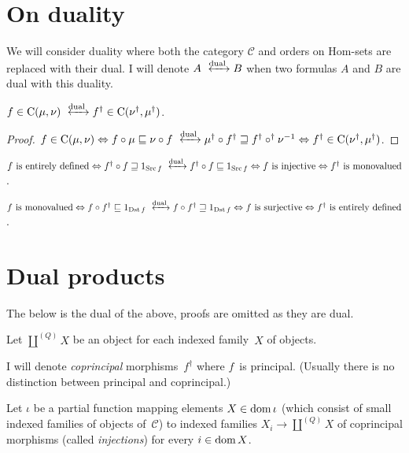 \section{On duality}

We will consider duality where both the category $\mathcal{C}$ and orders on
Hom-sets are replaced with their dual. I will denote $A
\xleftrightarrow{\dual} B$ when two formulas $A$ and $B$ are dual with
this duality.

\begin{prop}
  $f \in \mathrm{C} (\mu, \nu) \xleftrightarrow{\dual} f^{\dagger}
  \in \mathrm{C} (\nu^{\dagger} , \mu^{\dagger})$.
\end{prop}

\begin{proof}
  $f \in \mathrm{C} (\mu, \nu) \Leftrightarrow f \circ \mu
  \sqsubseteq \nu \circ f \xleftrightarrow{\dual} \mu^{\dagger}
  \circ f^{\dagger} \sqsupseteq f^{\dagger} \circ^{\dagger} \nu^{- 1}
  \Leftrightarrow f^{\dagger} \in \mathrm{C} (\nu^{\dagger} ,
  \mu^{\dagger})$.
\end{proof}

$f \text{ is entirely defined} \Leftrightarrow f^{\dagger} \circ f \sqsupseteq
1_{\Src f} \xleftrightarrow{\dual} f^{\dagger} \circ f \sqsubseteq
1_{\Src f} \Leftrightarrow f \text{ is injective} \Leftrightarrow
f^{\dagger} \text{ is monovalued}$.

$f \text{ is monovalued} \Leftrightarrow f \circ f^{\dagger} \sqsubseteq
1_{\Dst f} \xleftrightarrow{\dual} f \circ f^{\dagger} \sqsupseteq
1_{\Dst f} \Leftrightarrow f \text{ is surjective} \Leftrightarrow
f^{\dagger} \text{ is entirely defined}$.

\section{Dual products}

The below is the dual of the above, proofs are omitted as they are dual.

Let $\coprod^{(Q)}X$ be an object for each indexed family~$X$ of objects.

I will denote \emph{coprincipal} morphisms~$f^{\dagger}$ where $f$~is principal. (Usually there is no distinction between
principal and coprincipal.)

Let $\iota$ be a partial function mapping elements $X\in\operatorname{dom}\iota$ (which consist of small indexed families of objects of~$\mathcal{C}$) to indexed families $X_i\to\coprod^{(Q)}X$ of coprincipal morphisms (called \emph{injections}) for every $i\in\operatorname{dom} X$.

